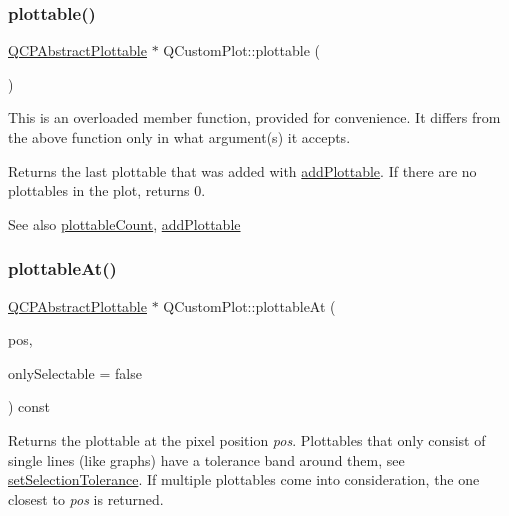 \subsubsection{\texorpdfstring{plottable()}{plottable()}\hspace{0.1cm}{\footnotesize\ttfamily [2/2]}}
{\footnotesize\ttfamily \hyperlink{class_q_c_p_abstract_plottable}{Q\+C\+P\+Abstract\+Plottable} $\ast$ Q\+Custom\+Plot\+::plottable (\begin{DoxyParamCaption}{ }\end{DoxyParamCaption})}

This is an overloaded member function, provided for convenience. It differs from the above function only in what argument(s) it accepts.

Returns the last plottable that was added with \hyperlink{class_q_custom_plot_ab7ad9174f701f9c6f64e378df77927a6}{add\+Plottable}. If there are no plottables in the plot, returns 0.

\begin{DoxySeeAlso}{See also}
\hyperlink{class_q_custom_plot_a5f4f15991c14bf9ad659bb2a19dfbed4}{plottable\+Count}, \hyperlink{class_q_custom_plot_ab7ad9174f701f9c6f64e378df77927a6}{add\+Plottable} 
\end{DoxySeeAlso}
\hypertarget{class_q_custom_plot_acddbbd8b16dd633f0d94e5a736fbd8cf}{}\label{class_q_custom_plot_acddbbd8b16dd633f0d94e5a736fbd8cf} 
\subsubsection{\texorpdfstring{plottable\+At()}{plottableAt()}}
{\footnotesize\ttfamily \hyperlink{class_q_c_p_abstract_plottable}{Q\+C\+P\+Abstract\+Plottable} $\ast$ Q\+Custom\+Plot\+::plottable\+At (\begin{DoxyParamCaption}\item[{const Q\+PointF \&}]{pos,  }\item[{bool}]{only\+Selectable = {\ttfamily false} }\end{DoxyParamCaption}) const}

Returns the plottable at the pixel position {\itshape pos}. Plottables that only consist of single lines (like graphs) have a tolerance band around them, see \hyperlink{class_q_custom_plot_a4dc31241d7b09680950e19e5f971ed93}{set\+Selection\+Tolerance}. If multiple plottables come into consideration, the one closest to {\itshape pos} is returned.

